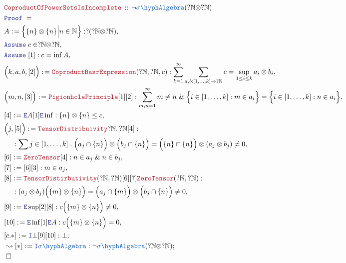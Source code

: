 \documentclass[12pt]{scrartcl}
\newcommand{\TYPE}[1]{\textcolor{NavyBlue}{\mathtt{#1}}}
\newcommand{\LOGIC}[1]{\textcolor{Blue}{\mathtt{#1}}}
\newcommand{\THM}[1]{\textcolor{Maroon}{\mathtt{#1}}}
\renewcommand{\.}{\; . \;}
\newcommand{\de}{: \kern 0.1pc =}
\newcommand{\Theorem}[2]{& \THM{#1} \, :: \, #2 \\ & \Proof = \\ }
\newcommand{\NewLine}{\\ & \kern 1pc}
\newcommand{\Page}[1]{ \begin{align*} #1 \end{align*}   }
\renewcommand{\And}{\; \& \;}
\newcommand{\Intro}{\LOGIC{I}}
\newcommand{\Elim}{\LOGIC{E}}
\newcommand{\Nat}{\mathbb{N} }
\newcommand{\Say}[3]{& #1 \de #2 : #3, \\}
\newcommand{\Conclude}[3]{& #1 \de #2 : #3; \\}
\newcommand{\DeriveConclude}[3]{& \leadsto #1 \de #2 : #3 ; \\}
\newcommand{\Assume}[2]{& \LOGIC{Assume} \; #1 : #2, \\}
\newcommand{\AssumeIn}[2]{& \LOGIC{Assume} \; #1 \in #2, \\}
\newcommand{\QED}{\; \square}
\newcommand{\EndProof}{& \QED \\}
\newcommand{\Proof}{\LOGIC{Proof} \; }
\newcommand{\SA}{\TYPE{\sigma \hyph Algebra}}
\begin{document}
\Page{
	\Theorem{CoproductOfPowerSetsIsIncomplete}
	{
		\neg \SA(?\Nat \otimes ?\Nat)
	}
	\Say{A}{\Big\{\{n\}\otimes\{n\} \Big| n \in \Nat   \Big\}}
	{
		?(?\Nat \otimes ?\Nat)
	}
	\AssumeIn{c}{?\Nat \otimes ?\Nat}	
	\Assume{[1]}{c = \inf A}
	\Say{\Big(k,a,b,[2]\Big)}{\THM{CoproductBasrExpression}(?\Nat,?\Nat,c)}
	{
		\sum_{k=1}^\infty  
		\sum_{a,b : [1,\ldots,k] \to ?\Nat} 
		c = \sup_{1\le i \le k} a_i \otimes b_i
	}
	\Say{\Big(m,n,[3]\Big)}{\THM{PigionholePrinciple} [1][2]}
	{
		\sum^\infty_{m,n=1} m \neq n \And
		\Big\{ i \in [1,\ldots,k] : m \in a_i \Big\} =
		\Big\{ i \in [1,\ldots,k] : n \in a_i \Big\}
	}
	\Say{[4]}{\Elim A [1] \Elim \inf}
	{
		\{n\} \otimes \{n\} \le c
	}
	\Say{\Big(j,[5]\Big)}{\THM{TensorDistribuivity}{?\Nat,?\Nat}[4]}
	{
		\NewLine :		
		\sum j \in [1,\ldots,k] \.
		\Big(a_j \cap \{n\}\Big) \otimes \Big(b_j \cap \{n\}\Big) =
		\Big(\{n\} \cap \{n\}\Big) \otimes ( a_j \otimes b_j ) \neq 0
	}
	\Say{[6]}{\THM{ZeroTensor}[4]}{ n \in a_j \And n \in b_j }
	\Say{[7]}{[6][3]}{m \in a_j}
	\Say{[8]}{
		\THM{TensorDistirbutivity}(?\Nat,?\Nat)
		[6][7]
		\THM{ZeroTensor}(?\Nat,?\Nat)	
	}
	{
		\NewLine :		
		(a_j \otimes b_j)\Big(\{m\} \otimes \{n\}\Big) = 
		\Big( a_j \cap \{m\} \Big) \otimes \Big( b_j \cap \{n\} \Big)
		\neq 0
	}
	\Say{[9]}{\Elim \sup [2][8]}
	{
		c\Big(\{m\} \otimes \{n\}\Big) \neq 0
	}
	\Say{[10]}{\Elim \inf [1]\Elim A}
	{
		c\Big(\{m\} \otimes \{n\}\Big) = 0
	}
	\Conclude{[c.*]}{\Intro \bot [9][10]}{\bot}
	\DeriveConclude{[*]}{\Intro \SA}
	{
		\neg \SA(?\Nat \otimes ?\Nat)
	}
	\EndProof
}
\newpage
\end{document}
